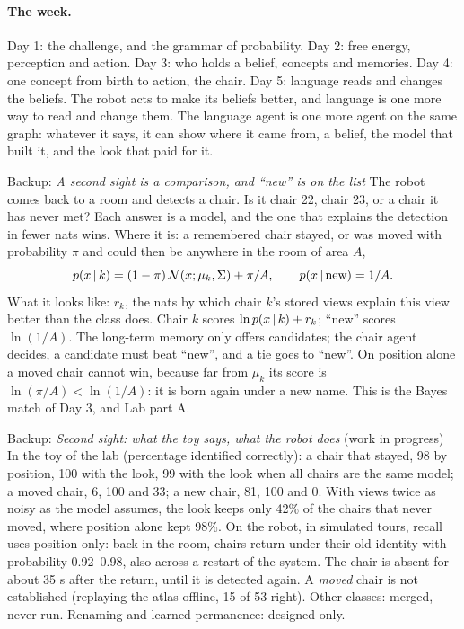 \documentclass[11pt]{article}
\begin{document}
\paragraph{The week.} Day 1: the challenge, and the grammar of probability. Day 2: free energy, perception and action. Day 3: who holds a belief, concepts and memories. Day 4: one concept from birth to action, the chair. Day 5: language reads and changes the beliefs. The robot acts to make its beliefs better, and language is one more way to read and change them. The language agent is one more agent on the same graph: whatever it says, it can show where it came from, a belief, the model that built it, and the look that paid for it.

\begin{backupbox}{Backup: \emph{A second sight is a comparison, and ``new'' is on the list}}
The robot comes back to a room and detects a chair. Is it chair 22, chair 23, or a chair it has never met? Each answer is a model, and the one that explains the detection in fewer nats wins. Where it is: a remembered chair stayed, or was moved with probability $\pi$ and could then be anywhere in the room of area $A$,
\[
p(x\,|\, k)=(1-\pi)\,\mathcal{N}(x;\mu_k,\Sigma)+\pi/A,\qquad p(x\,|\,\text{new})=1/A .
\]
What it looks like: $r_k$, the nats by which chair $k$'s stored views explain this view better than the class does. Chair $k$ scores $\ln p(x\,|\, k)+r_k$; ``new'' scores $\ln(1/A)$. The long-term memory only offers candidates; the chair agent decides, a candidate must beat ``new'', and a tie goes to ``new''. On position alone a moved chair cannot win, because far from $\mu_k$ its score is $\ln(\pi/A)<\ln(1/A)$: it is born again under a new name. This is the Bayes match of Day 3, and Lab part A.
\end{backupbox}

\begin{backupbox}{Backup: \emph{Second sight: what the toy says, what the robot does} (work in progress)}
In the toy of the lab (percentage identified correctly): a chair that stayed, 98 by position, 100 with the look, 99 with the look when all chairs are the same model; a moved chair, 6, 100 and 33; a new chair, 81, 100 and 0. With views twice as noisy as the model assumes, the look keeps only 42\% of the chairs that never moved, where position alone kept 98\%. On the robot, in simulated tours, recall uses position only: back in the room, chairs return under their old identity with probability 0.92--0.98, also across a restart of the system. The chair is absent for about 35 s after the return, until it is detected again. A \emph{moved} chair is not established (replaying the atlas offline, 15 of 53 right). Other classes: merged, never run. Renaming and learned permanence: designed only.
\end{backupbox}
\end{document}
